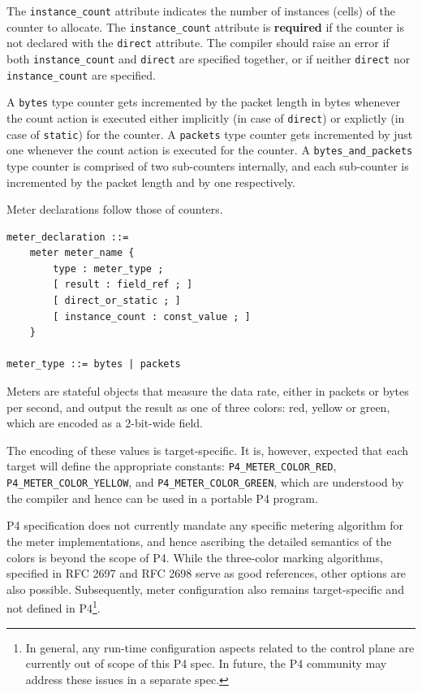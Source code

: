 \documentclass[12pt]{article}
\begin{document}
The \texttt{instance_count} attribute indicates the number of
instances (cells) of the counter to allocate. The
\texttt{instance_count} attribute is \textbf{required} if the counter
is not declared with the \texttt{direct} attribute.  The compiler
should raise an error if both \texttt{instance_count} and
\texttt{direct} are specified together, or if neither \texttt{direct}
nor \texttt{instance_count} are specified.  

A \texttt{bytes} type counter gets incremented by the packet length in bytes 
whenever the count action is executed either implicitly (in case of 
\texttt{direct}) or explictly (in case of \texttt{static}) for the counter. 
A \texttt{packets} type counter gets incremented by just one whenever 
the count action is executed for the counter. 
A \texttt{bytes_and_packets} type counter is comprised of two sub-counters 
internally, and each sub-counter is incremented by the packet length and 
by one respectively.


Meter declarations follow those of counters.

\begin{lstlisting}[style=BNFstyle]
meter_declaration ::= 
    meter meter_name {
        type : meter_type ;
        [ result : field_ref ; ]
        [ direct_or_static ; ]
        [ instance_count : const_value ; ]
    }

meter_type ::= bytes | packets
\end{lstlisting}

Meters are stateful objects that measure the data rate, either in 
packets or bytes per second, and output the result as one of three 
colors: red, yellow or green, which are encoded as a 2-bit-wide field.

The encoding of these values is target-specific. It is, however, 
expected that each target will define the appropriate constants: 
\texttt{P4_METER_COLOR_RED}, \texttt{P4_METER_COLOR_YELLOW},
and \texttt{P4_METER_COLOR_GREEN}, which are understood by the compiler
and hence can be used in a portable P4 program.

P4 specification does not currently mandate any specific metering 
algorithm for the meter implementations, and hence ascribing the 
detailed semantics of the colors is beyond the scope of P4. While 
the three-color marking algorithms, specified in RFC 2697 and RFC 2698 
serve as good references, other options are also possible. Subsequently, 
meter configuration also remains target-specific and not defined 
in P4\footnote{In general, any run-time configuration aspects related 
to the control plane are currently out of scope of this P4 spec. In future, 
the P4 community may address these issues in a separate spec.}.
\end{document}
